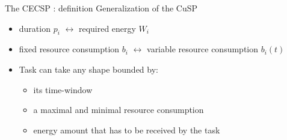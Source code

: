 \begin{frame}{The CECSP : definition }
  Generalization of the CuSP
  \begin{itemize}
    \vfill
  \item duration $p_i$ $\leftrightarrow$ required energy  $W_i$
    \vfill
  \item fixed resource consumption $b_i$ $\leftrightarrow$ variable
    resource consumption $b_i(t)$ 
    \vfill  
  \item<2-> Task can take any shape bounded by:
    \begin{itemize}
    \item<2-> its time-window
    \item<3-> a maximal and minimal resource consumption
    \item<4-> energy amount that has to be received by the task
    \end{itemize}
    \vfill
  \end{itemize}
  \begin{overlayarea}{\textwidth}{3cm}
     {
      \vfill
      \begin{columns}
        \begin{column}{0.45\linewidth}
          
        \end{column}
        \begin{column}{0.45\linewidth}
          
        \end{column}
      \end{columns}
      \vfill}
  \end{overlayarea}
\end{frame}

